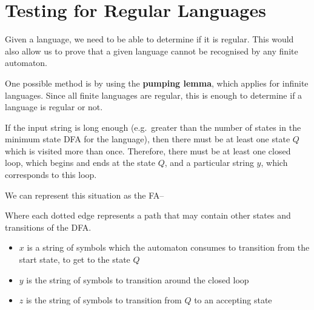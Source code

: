\section*{Testing for Regular Languages}

Given a language, we need to be able to determine if it is regular. This would also allow us to prove that a given
 language cannot be recognised by any finite automaton.

One possible method is by using the \textbf{pumping lemma}, which applies for infinite languages. Since all finite
 languages are regular, this is enough to determine if a language is regular or not.

If the input string is long enough (e.g.\ greater than the number of states in the minimum state DFA for the language),
 then there must be at least one state $Q$ which is visited more than once. Therefore, there must be at least one closed
 loop, which begins and ends at the state $Q$, and a particular string $y$, which corresponds to this loop.

We can represent this situation as the FA--
\begin{center}
\end{center}
Where each dotted edge represents a path that may contain other states and transitions of the DFA.
\begin{itemize}
  \item $x$ is a string of symbols which the automaton consumes to transition from the start state, to get to the state
   $Q$
  \item $y$ is the string of symbols to transition around the closed loop
  \item $z$ is the string of symbols to transition from $Q$ to an accepting state
\end{itemize}

